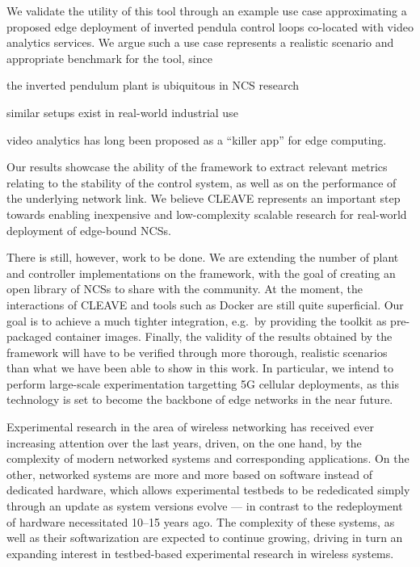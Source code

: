 We validate the utility of this tool through an example use case approximating a proposed edge deployment of inverted pendula control loops co-located with video analytics services.
We argue such a use case represents a realistic scenario and appropriate benchmark for the tool, since
\begin{enumerate*}[itemjoin={{; }}, itemjoin*={{; and }}]
    \item the inverted pendulum plant is ubiquitous in \ac{NCS} research
    \item similar setups exist in real-world industrial use
    \item video analytics has long been proposed as a ``killer app'' for edge computing.
\end{enumerate*}
Our results showcase the ability of the framework to extract relevant metrics relating to the stability of the control system, as well as on the performance of the underlying network link.
We believe \ac{CLEAVE} represents an important step towards enabling inexpensive and low-complexity scalable research for real-world deployment of edge-bound \acp{NCS}.

There is still, however, work to be done.
We are extending the number of plant and controller implementations on the framework, with the goal of creating an open library of \acp{NCS} to share with the community.
At the moment, the interactions of \ac{CLEAVE} and tools such as Docker are still quite superficial.
Our goal is to achieve a much tighter integration, e.g.\ by providing the toolkit as pre-packaged container images.
Finally, the validity of the results obtained by the framework will have to be verified through more thorough, realistic scenarios than what we have been able to show in this work.
In particular, we intend to perform large-scale experimentation targetting 5G cellular deployments, as this technology is set to become the backbone of edge networks in the near future.


Experimental research in the area of wireless networking has received ever increasing attention over the last years, driven, on the one hand, by the complexity of modern networked systems and corresponding applications. 
On the other, networked systems are more and more based on software instead of dedicated hardware, which allows experimental testbeds to be rededicated simply through an update as system versions evolve --- in contrast to the redeployment of hardware necessitated \numrange[range-phrase={--}]{10}{15} years ago.
The complexity of these systems, as well as their softwarization are expected to continue growing, driving in turn an expanding interest in testbed-based experimental research in wireless systems.

